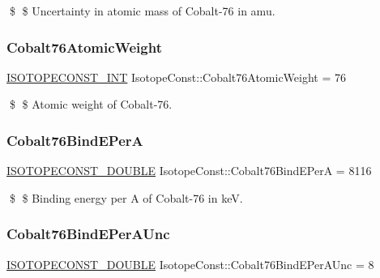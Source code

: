 \$ \$ Uncertainty in atomic mass of Cobalt-\/76 in amu. \mbox{\label{group___isotope_const-_cobalt-_co76_ga3b84d4e58deda2edde7949865ed9b780}} 
\subsubsection{\texorpdfstring{Cobalt76\+Atomic\+Weight}{Cobalt76AtomicWeight}}
{\footnotesize\ttfamily \mbox{\hyperlink{group___isotope_const-_macros_ga5f18360b3e99483a35c32d789e62621c}{I\+S\+O\+T\+O\+P\+E\+C\+O\+N\+S\+T\+\_\+\+I\+NT}} Isotope\+Const\+::\+Cobalt76\+Atomic\+Weight = 76}

\$ \$ Atomic weight of Cobalt-\/76. \mbox{\label{group___isotope_const-_cobalt-_co76_ga79866906c0809965f6919296cdbbd869}} 
\subsubsection{\texorpdfstring{Cobalt76\+Bind\+E\+PerA}{Cobalt76BindEPerA}}
{\footnotesize\ttfamily \mbox{\hyperlink{group___isotope_const-_macros_ga8f45a7272ce02c0b4c65c44636ed719a}{I\+S\+O\+T\+O\+P\+E\+C\+O\+N\+S\+T\+\_\+\+D\+O\+U\+B\+LE}} Isotope\+Const\+::\+Cobalt76\+Bind\+E\+PerA = 8116}

\$ \$ Binding energy per A of Cobalt-\/76 in keV. \mbox{\label{group___isotope_const-_cobalt-_co76_gabd4105220171b15ad9a85f52dc77d8b4}} 
\subsubsection{\texorpdfstring{Cobalt76\+Bind\+E\+Per\+A\+Unc}{Cobalt76BindEPerAUnc}}
{\footnotesize\ttfamily \mbox{\hyperlink{group___isotope_const-_macros_ga8f45a7272ce02c0b4c65c44636ed719a}{I\+S\+O\+T\+O\+P\+E\+C\+O\+N\+S\+T\+\_\+\+D\+O\+U\+B\+LE}} Isotope\+Const\+::\+Cobalt76\+Bind\+E\+Per\+A\+Unc = 8}

